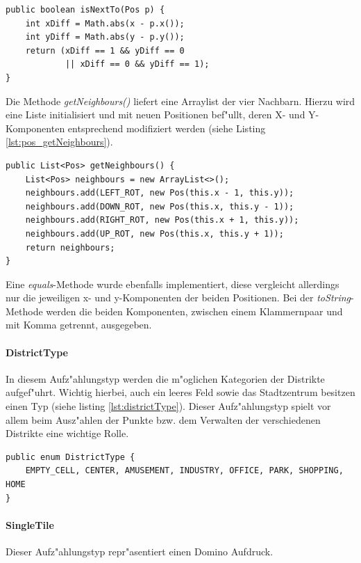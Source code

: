 \begin{lstlisting}[float,style=CodeHighlighting,caption=Pos - isNextTo(),label=lst:pos_isNextTo]
public boolean isNextTo(Pos p) {
    int xDiff = Math.abs(x - p.x());
	int yDiff = Math.abs(y - p.y());
	return (xDiff == 1 && yDiff == 0
            || xDiff == 0 && yDiff == 1);
}
\end{lstlisting}

Die Methode \emph{getNeighbours()} liefert eine Arraylist der vier Nachbarn. Hierzu wird eine Liste initialisiert und mit neuen Positionen bef"ullt, deren X- und Y-Komponenten entsprechend modifiziert werden (siehe Listing \ref{lst:pos_getNeighbours}). 

\begin{lstlisting}[float,style=CodeHighlighting,caption=Pos - getNeighbours(),label=lst:pos_getNeighbours]
public List<Pos> getNeighbours() {
    List<Pos> neighbours = new ArrayList<>();
    neighbours.add(LEFT_ROT, new Pos(this.x - 1, this.y));
    neighbours.add(DOWN_ROT, new Pos(this.x, this.y - 1));
    neighbours.add(RIGHT_ROT, new Pos(this.x + 1, this.y));
    neighbours.add(UP_ROT, new Pos(this.x, this.y + 1));
    return neighbours;
}
\end{lstlisting}

Eine \emph{equals}-Methode wurde ebenfalls implementiert, diese vergleicht allerdings nur die jeweiligen x- und y-Komponenten der beiden Positionen. Bei der \emph{toString}-Methode werden die beiden Komponenten, zwischen einem Klammernpaar und mit Komma getrennt, ausgegeben. 

\paragraph{DistrictType}
\label{par:districtType}
In diesem Aufz"ahlungstyp werden die m"oglichen Kategorien der Distrikte aufgef"uhrt. Wichtig hierbei, auch ein leeres Feld sowie das Stadtzentrum besitzen einen Typ (siehe listing \ref{lst:districtType}). 
Dieser Aufz"ahlungstyp spielt vor allem beim Ausz"ahlen der Punkte bzw. dem Verwalten der verschiedenen Distrikte eine wichtige Rolle. 
\begin{lstlisting}[float,style=CodeHighlighting,caption=DistrictType,label=lst:districtType]
public enum DistrictType {
    EMPTY_CELL, CENTER, AMUSEMENT, INDUSTRY, OFFICE, PARK, SHOPPING, HOME
}
\end{lstlisting}

\paragraph{SingleTile}
\label{par:singleTile}
Dieser Aufz"ahlungstyp repr"asentiert einen Domino Aufdruck. 

